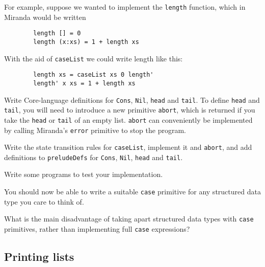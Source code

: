 For example, suppose we wanted to implement the \mbox{\tt length} function, which in
Miranda would be written
\begin{verbatim}
        length [] = 0
        length (x:xs) = 1 + length xs
\end{verbatim}
With the aid of \mbox{\tt caseList} we could write length like this:
\begin{verbatim}
        length xs = caseList xs 0 length'
        length' x xs = 1 + length xs
\end{verbatim}

\begin{exercise}
Write Core-language definitions for
\mbox{\tt Cons}, \mbox{\tt Nil}, \mbox{\tt head} and
\mbox{\tt tail}. To define \mbox{\tt head} and \mbox{\tt tail},
you will need to introduce a new
primitive \mbox{\tt abort}, which is returned if you take the \mbox{\tt head} or \mbox{\tt tail} of
an empty list.
\mbox{\tt abort} can conveniently be implemented by
calling Miranda's \mbox{\tt error} primitive to stop the program.
\end{exercise}

\begin{exercise}
Write the state transition rules for \mbox{\tt caseList},
implement it and \mbox{\tt abort},
and add definitions to \mbox{\tt preludeDefs} for \mbox{\tt Cons}, \mbox{\tt Nil}, \mbox{\tt head} and
\mbox{\tt tail}.

Write some programs to test your implementation.
\end{exercise}

You should now be able to write a suitable \mbox{\tt case} primitive for any
structured data type you care to think of.
\begin{exercise}
What is the main disadvantage of taking apart structured data types
with \mbox{\tt case} primitives,
rather than implementing full \mbox{\tt case} expressions?
\end{exercise}

\subsection{Printing lists}
\label{sect:templ:print-list}

